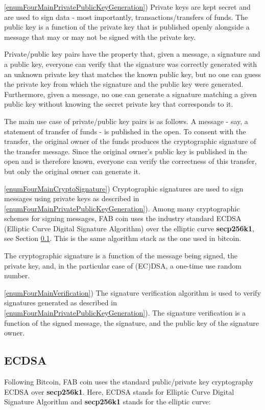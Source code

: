\documentclass{article}
\newcommand{\secpTwoFiveSixKone}{{\bf secp256k1}}
\begin{document}
\noindent\ref{enumFourMainPrivatePublicKeyGeneration}) Private keys are kept secret and are used to sign data - most importantly, transactions/transfers of funds. The public key is a function of the private key that is published openly alongside a message that may or may not be signed with the private key. 

Private/public key pairs have the property that, given a message, a signature and a public key, everyone can verify that the signature was correctly generated with an unknown private key that matches the known public key, but no one can guess the private key from which the signature and the public key were generated. Furthermore, given a message, no one can generate a signature matching a given public key without knowing the secret private key that corresponds to it.

The main use case of private/public key pairs is as follows. A message - say, a statement of transfer of funds - is published in the open. To consent with the transfer, the original owner of the funds produces the cryptographic signature of the transfer message. Since the original owner's public key is published in the open and is therefore known, everyone can verify the correctness of this transfer, but only the original owner can generate it.

\noindent\ref{enumFourMainCryptoSignature}) Cryptographic signatures are used to sign messages using private keys as described in \ref{enumFourMainPrivatePublicKeyGeneration}). Among many cryptographic schemes for signing messages, FAB coin uses the industry standard ECDSA (Elliptic Curve Digital Signature Algorithm) over the elliptic curve \secpTwoFiveSixKone, see Section \ref{sectionECDSAgeneral}. This is the same algorithm stack as the one used in bitcoin.

The cryptographic signature is a function of the message being signed, the private key, and, in the particular case of (EC)DSA, a one-time use random number.

\noindent\ref{enumFourMainVerification}) The signature verification algorithm is used to verify signatures generated as described in \ref{enumFourMainPrivatePublicKeyGeneration}). The signature verification is a function of the signed message, the signature, and the public key of the signature owner.

\subsection{ECDSA}\label{sectionECDSAgeneral}
Following Bitcoin, FAB coin uses the standard public/private key cryptography ECDSA over \secpTwoFiveSixKone. Here, ECDSA stands for Elliptic Curve Digital Signature Algorithm and \secpTwoFiveSixKone{} stands for the elliptic curve:
\end{document}
